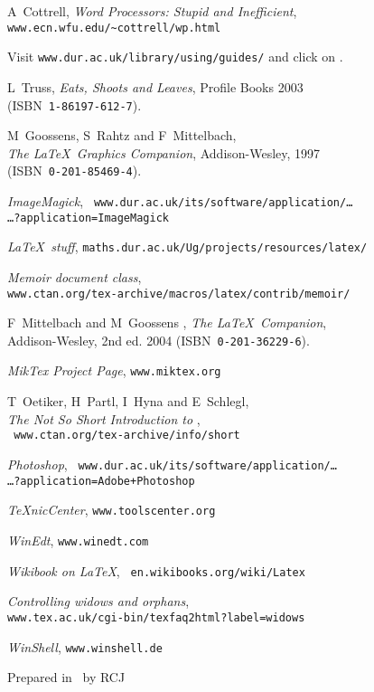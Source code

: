 \begin{thebibliography}{9999}%

A~Cottrell, \textsl{Word Processors: Stupid and
Inefficient},
\\ \mbox{}\hfill\texttt{www.ecn.wfu.edu/\~{}cottrell/wp.html}

Visit \texttt{www.dur.ac.uk/library/using/guides/}
and click on .

L~Truss, \textsl{Eats, Shoots and Leaves}, Profile
  Books 2003\\ \mbox{}\hfill(ISBN~\texttt{1-86197-612-7}).

M~Goossens, S~Rahtz and F~Mittelbach,\\
  \mbox{}\hfill \textsl{The \LaTeX\ Graphics Companion},
  Addison-Wesley, 1997\\  \mbox{}\hfill(ISBN~\texttt{0-201-85469-4}).

 \textsl{ImageMagick}, {\tt%
www.dur.ac.uk/its/software/application/\dots
\\ \mbox{}\hfill\dots?application=ImageMagick}

 \textsl{\LaTeX\ stuff},
	\texttt{maths.dur.ac.uk/Ug/projects/resources/latex/}

 \textsl{Memoir document class},\\ \mbox{}\hfill
   \texttt{www.ctan.org/tex-archive/macros/latex/contrib/memoir/}

F~Mittelbach and M~Goossens \etal, \textsl{The
\LaTeX\ Companion},\\  \mbox{}\hfill Addison-Wesley, 2nd ed. 2004
(ISBN~\texttt{0-201-36229-6}).

 \textsl{MikTex Project Page}, \texttt{www.miktex.org}

T~Oetiker, H~Partl, I~Hyna and E~Schlegl,\\
\mbox{}\hfill
\textsl{The Not So Short Introduction to \LaTeXe},\\ \mbox{}\hfill{\tt
www.ctan.org/tex-archive/info/short}

 \textsl{Photoshop}, {\tt%
www.dur.ac.uk/its/software/application/\dots
\\ \mbox{}\hfill\dots?application=Adobe+Photoshop}

 \textsl{TeXnicCenter}, \texttt{www.toolscenter.org}

 \textsl{WinEdt}, \texttt{www.winedt.com}

 \textsl{Wikibook on \LaTeX}, \texttt{%
	en.wikibooks.org/wiki/Latex}

 \textsl{Controlling widows and orphans},
\\ \mbox{}\hfill\texttt{www.tex.ac.uk/cgi-bin/texfaq2html?label=widows}

 \textsl{WinShell}, \texttt{www.winshell.de}

\end{thebibliography}
\vfill
\begin{flushright}\small Prepared in \LaTeXe\ by RCJ\end{flushright}
